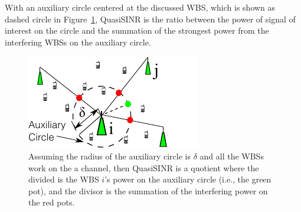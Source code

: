 \documentclass[times]{ettauth}
\newcommand{\ie}{i.e., }
\theoremstyle{mytheoremstyle}
\theoremstyle{mytheoremstyle}
\theoremstyle{mytheoremstyle}
\begin{document}
With an auxiliary circle centered at the discussed WBS, which is shown as dashed circle in Figure~\ref{quasiSINRfigure}, QuasiSINR is the ratio between the power of signal of interest on the circle and the summation of the strongest power from the interfering WBSs on the auxiliary circle.

\begin{figure}[h!]
  \centering
  \includegraphics[width=0.6\linewidth]{quasiSINR2_2.pdf}
  \caption{Assuming the radius of the auxiliary circle is $\delta$ and all the WBSs work on the a channel, then QuasiSINR is a quotient where the divided is the WBS $i$'s power on the auxiliary circle (\ie the green pot), and the divisor is the summation of the interfering power on the red pots.}
\label{quasiSINRfigure}
\end{figure}
\end{document}
